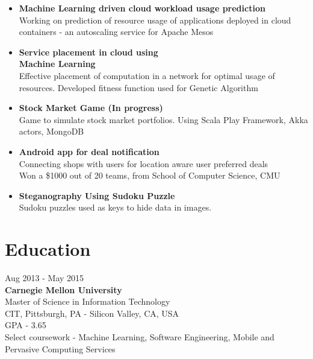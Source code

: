 \documentclass{tccv}
\begin{document}
\begin{itemize}

\item\textbf{Machine Learning driven cloud workload usage prediction}\\
     {Working on prediction of resource usage of applications deployed in cloud containers - an autoscaling service for Apache Mesos}
\item\textbf{Service placement in cloud using \\Machine Learning}\\
     {Effective placement of computation in a network for optimal usage of resources. Developed fitness function 
used for Genetic Algorithm}

\item\textbf{Stock Market Game (In progress)}\\
Game to simulate stock market portfolios. Using Scala Play Framework, Akka actors, MongoDB

\item\textbf{Android app for deal notification}\\
     {Connecting shops with users for location aware user preferred deals}\\
     Won a \$1000 {} out of 20 teams, from School of Computer Science, CMU

\item\textbf{Steganography Using Sudoku Puzzle}\\
     {Sudoku puzzles used as keys to hide data in images.
     }

\end{itemize}

\section{Education}

{\hfill\sc Aug 2013 - May 2015}\\
\textbf{Carnegie Mellon University}\\ 
Master of Science in Information Technology\\
CIT, Pittsburgh, PA - Silicon Valley, CA, USA\\
GPA - 3.65\\
Select coursework - Machine Learning, Software Engineering, Mobile and Pervasive Computing Services\\
\end{document}
